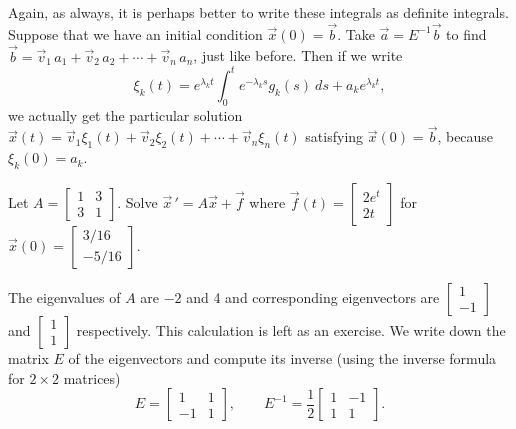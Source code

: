 \documentclass[12pt]{book}
\begin{document}
\medskip

Again, as always,
it is perhaps better to write these integrals as definite integrals.  
Suppose that we have an initial condition $\vec{x}(0) = \vec{b}$.
Take $\vec{a} = E^{-1} \vec{b}$ to find
$\vec{b} = \vec{v}_1 \, a_1 + \vec{v}_2 \, a_2 + \cdots + \vec{v}_n \, a_n$, just like before.
Then if we write 
\begin{equation*}
\boxed{~~
\xi_k(t) =  e^{\lambda_k t} 
\int_0^t e^{-\lambda_k s} g_k(s) ~ds + a_k e^{\lambda_k t} ,
~~}
\end{equation*}
we actually get the particular solution
$\vec{x}(t) =
\vec{v}_1 \xi_1(t) + 
\vec{v}_2 \xi_2(t) + \cdots +
\vec{v}_n \xi_n(t)$ satisfying $\vec{x}(0) = \vec{b}$,
because $\xi_k(0) = a_k$.

\begin{example}
Let $A = \left[
\begin{smallmatrix}
1 & 3 \\
3 & 1
\end{smallmatrix} \right]$.
Solve ${\vec{x}\,}' = A \vec{x} +
\vec{f}$ where $\vec{f}(t) = 
\left[ \begin{smallmatrix}
2e^t \\
2t
\end{smallmatrix} \right]$ for $\vec{x}(0) =
\left[ \begin{smallmatrix}
3/16 \\
-5/16
\end{smallmatrix} \right]$.

The eigenvalues of $A$ are $-2$ and 4 and corresponding eigenvectors
are
$\left[ \begin{smallmatrix}
1 \\
-1
\end{smallmatrix} \right]$ and
$\left[ \begin{smallmatrix}
1 \\
1
\end{smallmatrix} \right]$ respectively.  This calculation is left as an
exercise.  We write down the matrix $E$ of the eigenvectors and compute its
inverse (using the inverse formula for $2 \times 2$ matrices)
\begin{equation*}
E = \begin{bmatrix}
1 & 1 \\
-1 & 1
\end{bmatrix} ,
\qquad
E^{-1}
=
\frac{1}{2}
\begin{bmatrix}
1 & -1 \\
1 & 1
\end{bmatrix} .
\end{equation*}


\end{example}
\end{document}
